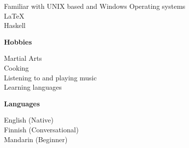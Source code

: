 \documentclass[a4paper]{article}
\newcommand{\mytitle}[1]{{\Large \textbf{#1}} \vspace{0.2cm}}
\begin{document}
\begin{minipage}[t]{0.3\linewidth}
{        Familiar with UNIX based and Windows Operating systems \\

        {\large \LaTeX} \\
        
        Haskell
    }

    \vspace{0.5cm}
    {
        \mytitle{Hobbies}

        Martial Arts \\
        Cooking \\
        Listening to and playing music \\
        Learning languages \\

    }
    \vspace{0.2cm}
    {
        \mytitle{Languages}

        English (Native) \\
        Finnish (Conversational) \\
        Mandarin (Beginner)
    }
%
%
\end{minipage}
%
\end{document}
